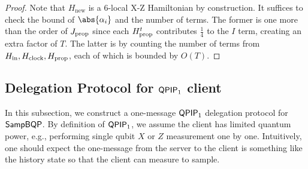 \begin{proof}
Note that $H_{\mathrm{new}}$ is a 6-local X-Z Hamiltonian by construction. It suffices to check the bound of $\abs{\alpha_i}$ and the number of terms. The former is one more than the order of $J_{\mathrm{prop}}$ since each $H_{\mathrm{prop}}^t$ contributes $\frac{1}{4}$ to the $I$ term, creating an extra factor of $T$. The latter is by counting the number of terms from $H_{\mathrm{in}}, H_{\mathrm{clock}}, H_{\mathrm{prop}}$, each of which is bounded by $O(T)$.
\end{proof}


\subsection{Delegation Protocol for $\operatorname{\mathsf{QPIP}}_1$ client}
\label{sec:qpip1}
In this subsection, we construct a one-message $\operatorname{\mathsf{QPIP}}_1$ delegation protocol for $\operatorname{\mathsf{SampBQP}}$. By definition of $\operatorname{\mathsf{QPIP}}_1$, we assume the client has limited quantum power, e.g., performing single qubit $X$ or $Z$ measurement one by one. 
Intuitively, one should expect the one-message from the server to the client is something like the history state so that the client can measure to sample.  

